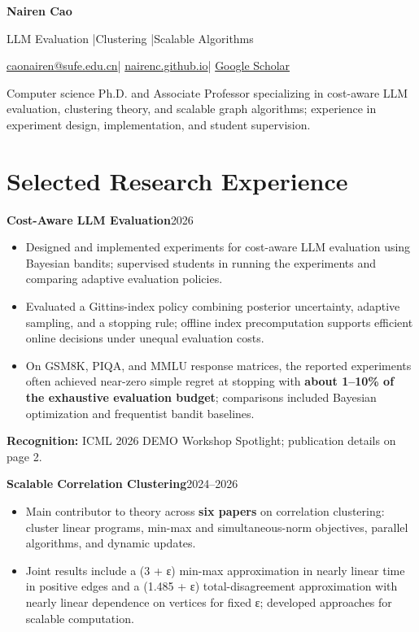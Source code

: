 \documentclass[10pt,a4paper]{article}
\newcommand{\project}[2]{\textbf{#1}\hfill{\small\color{ink}#2}\par}
\newcounter{paper}
\begin{document}
\fontsize{10.5}{13}\selectfont
{\fontsize{25}{28}\selectfont\bfseries\color{ink}Nairen Cao}\par
{\large LLM Evaluation \enspace |\enspace Clustering \enspace |\enspace Scalable Algorithms}\par
\href{mailto:caonairen@sufe.edu.cn}{caonairen@sufe.edu.cn}\quad |\quad
\href{https://nairenc.github.io}{nairenc.github.io}\quad |\quad
\href{https://scholar.google.com/citations?user=OiiBPDwAAAAJ}{Google Scholar}\par
Computer science Ph.D. and Associate Professor specializing in cost-aware LLM evaluation, clustering theory, and scalable graph algorithms; experience in experiment design, implementation, and student supervision.

\section{Selected Research Experience}
\project{Cost-Aware LLM Evaluation}{2026}
\begin{itemize}
\item Designed and implemented experiments for cost-aware LLM evaluation using Bayesian bandits; supervised students in running the experiments and comparing adaptive evaluation policies.
\item Evaluated a Gittins-index policy combining posterior uncertainty, adaptive sampling, and a stopping rule; offline index precomputation supports efficient online decisions under unequal evaluation costs.
\item On GSM8K, PIQA, and MMLU response matrices, the reported experiments often achieved near-zero simple regret at stopping with \textbf{about 1--10\% of the exhaustive evaluation budget}; comparisons included Bayesian optimization and frequentist bandit baselines.
\end{itemize}
{\small\textbf{Recognition:} ICML 2026 DEMO Workshop Spotlight; publication details on page 2.}\par
\vspace{4pt}
\project{Scalable Correlation Clustering}{2024--2026}
\begin{itemize}
\item Main contributor to theory across \textbf{six papers} on correlation clustering: cluster linear programs, min-max and simultaneous-norm objectives, parallel algorithms, and dynamic updates.
\item Joint results include a (3 + ε) min-max approximation in nearly linear time in positive edges and a (1.485 + ε) total-disagreement approximation with nearly linear dependence on vertices for fixed ε; developed approaches for scalable computation.
\end{itemize}
\end{document}
